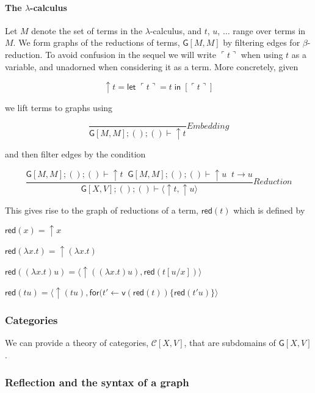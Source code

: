 \documentclass[12pt]{llncs}
\begin{document}
\hypertarget{the-lambda-calculus}{%
\paragraph{\texorpdfstring{The
\(\lambda\)-calculus}{The \textbackslash lambda-calculus}}\label{the-lambda-calculus}}

Let \(M\) denote the set of terms in the \(\lambda\)-calculus, and
\(t\), \(u\), \(\ldots\) range over terms in \(M\). We form graphs of
the reductions of terms, \(\mathsf{G}[M,M]\) by filtering edges for
\(\beta\)-reduction. To avoid confusion in the sequel we will write
\(\ulcorner t\urcorner\) when using \(t\) as a variable, and unadorned
when considering it as a term. More concretely, given

\[\uparrow t = \mathsf{let}\; \ulcorner t \urcorner = t \; \mathsf{in}\; [\ulcorner t \urcorner] \]

we lift terms to graphs using

\[\frac{ }{ \mathsf{G}[M,M]; (); () \vdash \uparrow t }Embedding\]

and then filter edges by the condition

\[\frac{ \mathsf{G}[M,M]; (); () \vdash \uparrow t \; \;\mathsf{G}[M,M]; (); () \vdash \uparrow u \;\; t \to u}{ \mathsf{G}[X,V]; (); () \vdash \langle \uparrow t,\uparrow u \rangle}Reduction\]

This gives rise to the graph of reductions of a term,
\(\mathsf{red}(t)\) which is defined by

\(\mathsf{red}(x) = \uparrow x\)

\(\mathsf{red}(\lambda x.t) = \uparrow (\lambda x.t)\)

\(\mathsf{red}((\lambda x.t)u) = \langle \uparrow ((\lambda x.t)u),\mathsf{red}(t[u/x])\rangle\)

\(\mathsf{red}(tu) = \langle \uparrow (tu),\mathsf{for}( t' \leftarrow \mathsf{v}( \mathsf{red}(t) )\{\mathsf{red}(t'u)\}\rangle\)

\hypertarget{categories}{%
\subsubsection{Categories}\label{categories}}

We can provide a theory of categories, \(\mathcal{C}[X,V]\), that are
subdomains of \(\mathsf{G}[X,V]\).

\hypertarget{reflection-and-the-syntax-of-a-graph}{%
\subsubsection{Reflection and the syntax of a
graph}\label{reflection-and-the-syntax-of-a-graph}}
\end{document}
